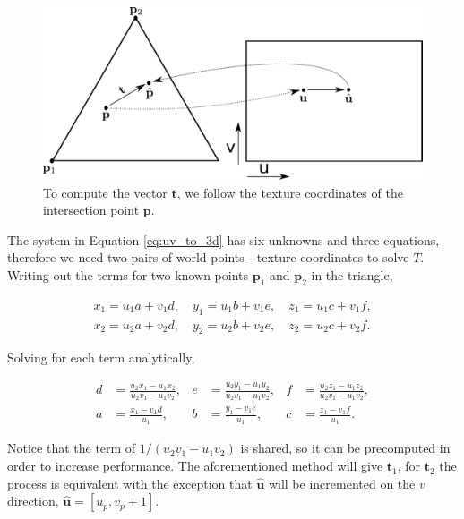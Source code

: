 \documentclass[12pt]{article}
\newcommand{\tb}{\mathbf{t}}
\begin{document}
\begin{figure}[htbp!]
\centering
\includegraphics[width=\textwidth]{images/thread_3d_coord}
	\caption{To compute the vector $\tb$, we follow the texture coordinates of the intersection point $\mathbf{p}$.}
	\label{fig:thread_uv_coord}
\end{figure}

The system in Equation \ref{eq:uv_to_3d} has six unknowns and three equations, therefore we need two pairs of world points - texture coordinates to solve $T$.
Writing out the terms for two known points $\mathbf{p}_1$ and $\mathbf{p}_2$ in the triangle,

\begin{equation}
\begin{split}
x_1 = u_1 a + v_1 d, \quad y_1 = u_1 b + v_1 e, \quad z_1 = u_1 c + v_1 f,\\
x_2 = u_2 a + v_2 d, \quad y_2 = u_2 b + v_2 e, \quad z_2 = u_2 c + v_2 f.
\end{split}
\end{equation}

Solving for each term analytically,

\begin{align}
d& = \frac{u_2 x_1 - u_1 x_2}{u_2 v_1 - u_1 v_2},& e& = \frac{u_2 y_1 - u_1 y_2}{u_2 v_1 - u_1 v_2},& f& = \frac{u_2 z_1 - u_1 z_2}{u_2 v_1 - u_1 v_2}, \\
a& = \frac{x_1 - v_1 d}{u_1},& b& = \frac{y_1 - v_1 e}{u_1},&  c& = \frac{z_1 - v_1 f}{u_1}.
\end{align}

Notice that the term of $1/(u_2 v_1 - u_1 v_2)$ is shared, so it can be precomputed in order to increase performance.
The aforementioned method will give $\tb_1$, for $\tb_2$ the process is equivalent with the exception that $\hat{\mathbf{u}}$ will be incremented on the $v$ direction, $\hat{\mathbf{u}} = \left[ u_p, v_p + 1\right]$.
\end{document}
